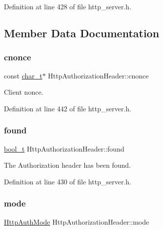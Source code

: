 Definition at line 428 of file http\+\_\+server.\+h.



\subsection{Member Data Documentation}
\mbox{\label{structHttpAuthorizationHeader_aa5dda5ba9a1648e6532776151b09fe0e}} 
\subsubsection{\texorpdfstring{cnonce}{cnonce}}
{\footnotesize\ttfamily const \hyperlink{compiler__port_8h_a40bb5262bf908c328fbcfbe5d29d0201}{char\+\_\+t}$\ast$ Http\+Authorization\+Header\+::cnonce}



Client nonce. 



Definition at line 442 of file http\+\_\+server.\+h.

\mbox{\label{structHttpAuthorizationHeader_a9d3817d89289e9abd71f3d6140ea4551}} 
\subsubsection{\texorpdfstring{found}{found}}
{\footnotesize\ttfamily \hyperlink{compiler__port_8h_a812d16e5494522586b3784e55d479912}{bool\+\_\+t} Http\+Authorization\+Header\+::found}



The Authorization header has been found. 



Definition at line 430 of file http\+\_\+server.\+h.

\mbox{\label{structHttpAuthorizationHeader_a806d5ed8b0f618361cfe251571605623}} 
\subsubsection{\texorpdfstring{mode}{mode}}
{\footnotesize\ttfamily \hyperlink{http__common_8h_ad435f9e57a3351beaec6fc809eff4f31}{Http\+Auth\+Mode} Http\+Authorization\+Header\+::mode}



